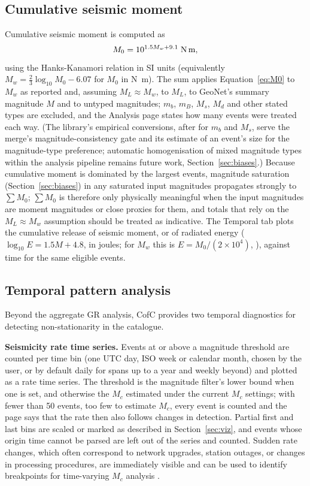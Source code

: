 \documentclass[12pt]{article}
\begin{document}
\subsection{Cumulative seismic moment}

Cumulative seismic moment is computed as
\begin{equation}
  M_0 = 10^{1.5 M_w + 9.1}\;\text{N\,m},
  \label{eq:M0}
\end{equation}
using the Hanks-Kanamori relation \citep{hanks1979,kanamori1977} in SI units
(equivalently $M_w = \tfrac{2}{3}\log_{10} M_0 - 6.07$ for $M_0$ in
\si{\newton\metre}).  The sum applies Equation~\eqref{eq:M0} to $M_w$ as
reported and, assuming $M_L \approx M_w$, to $M_L$, to GeoNet's summary
magnitude $M$ and to untyped magnitudes; $m_b$, $m_B$, $M_s$, $M_d$ and other stated types are excluded, and
the Analysis page states how many events were treated each way.  (The library's
empirical conversions, after \citet{scordilis2006} for $m_b$ and $M_s$, serve the
merge's magnitude-consistency gate and its estimate of an event's size for the
magnitude-type preference; automatic homogenisation of mixed magnitude
types within the analysis pipeline remains future work,
Section~\ref{sec:biases}.)  Because cumulative moment is dominated by the largest
events, magnitude saturation (Section~\ref{sec:biases}) in any saturated input
magnitudes propagates strongly to $\sum M_0$; $\sum M_0$ is therefore only
physically meaningful when the input magnitudes are moment magnitudes or close
proxies for them, and totals that rely on the $M_L \approx M_w$ assumption should
be treated as indicative.  The Temporal tab plots the cumulative release of
seismic moment, or of radiated energy ($\log_{10} E = 1.5M + 4.8$, in joules;
for $M_w$ this is $E = M_0/(2 \times 10^{4})$, \citealp{kanamori1977}), against
time for the same eligible events.

\subsection{Temporal pattern analysis}

Beyond the aggregate GR analysis, CofC provides two temporal diagnostics
for detecting non-stationarity in the catalogue.

\textbf{Seismicity rate time series.}  Events at or above a magnitude threshold
are counted per time bin (one UTC day, ISO week or calendar month, chosen by the
user, or by default daily for spans up to a year and weekly beyond) and plotted as
a rate time series.  The threshold is the magnitude filter's lower bound when one
is set, and otherwise the $M_c$ estimated under the current $M_c$ settings; with
fewer than 50 events, too few to estimate $M_c$, every event is counted and the
page says that the rate then also follows changes in detection.  Partial first
and last bins are scaled or marked as described in Section~\ref{sec:viz}, and
events whose origin time cannot be parsed are left out of the series and
counted.  Sudden rate changes, which often correspond to network upgrades, station outages, or changes
in processing procedures, are immediately visible and can be used to identify
breakpoints for time-varying $M_c$ analysis \citep{mignan2012}.
\end{document}
